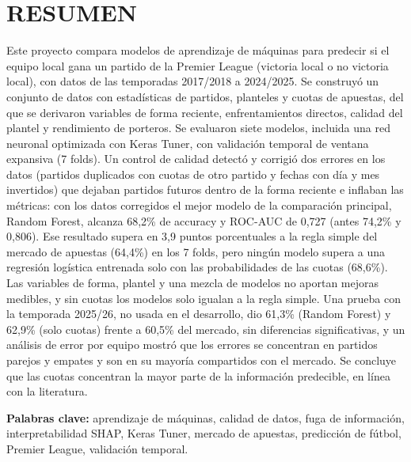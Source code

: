 \documentclass[12pt,letterpaper,oneside]{report}
\begin{document}
\tableofcontents
\clearpage
\listoffigures
\clearpage
\listoftables
\clearpage

\chapter*{RESUMEN}
\begin{singlespace}
Este proyecto compara modelos de aprendizaje de máquinas para predecir si el equipo local gana un partido de la Premier League (victoria local o no victoria local), con datos de las temporadas 2017/2018 a 2024/2025. Se construyó un conjunto de datos con estadísticas de partidos, planteles y cuotas de apuestas, del que se derivaron variables de forma reciente, enfrentamientos directos, calidad del plantel y rendimiento de porteros. Se evaluaron siete modelos, incluida una red neuronal optimizada con Keras Tuner, con validación temporal de ventana expansiva (7 folds). Un control de calidad detectó y corrigió dos errores en los datos (partidos duplicados con cuotas de otro partido y fechas con día y mes invertidos) que dejaban partidos futuros dentro de la forma reciente e inflaban las métricas: con los datos corregidos el mejor modelo de la comparación principal, Random Forest, alcanza 68,2\% de accuracy y ROC-AUC de 0,727 (antes 74,2\% y 0,806). Ese resultado supera en 3,9 puntos porcentuales a la regla simple del mercado de apuestas (64,4\%) en los 7 folds, pero ningún modelo supera a una regresión logística entrenada solo con las probabilidades de las cuotas (68,6\%). Las variables de forma, plantel y una mezcla de modelos no aportan mejoras medibles, y sin cuotas los modelos solo igualan a la regla simple. Una prueba con la temporada 2025/26, no usada en el desarrollo, dio 61,3\% (Random Forest) y 62,9\% (solo cuotas) frente a 60,5\% del mercado, sin diferencias significativas, y un análisis de error por equipo mostró que los errores se concentran en partidos parejos y empates y son en su mayoría compartidos con el mercado. Se concluye que las cuotas concentran la mayor parte de la información predecible, en línea con la literatura.
\end{singlespace}

\textbf{Palabras clave:} aprendizaje de máquinas, calidad de datos, fuga de información, interpretabilidad SHAP, Keras Tuner, mercado de apuestas, predicción de fútbol, Premier League, validación temporal.
\end{document}
